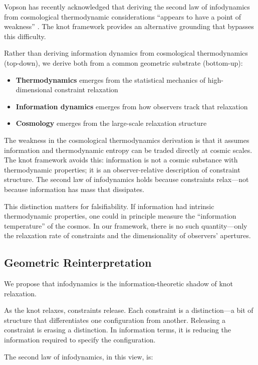\documentclass[11pt,a4paper]{article}
\begin{document}
Vopson has recently acknowledged that deriving the second law of infodynamics from cosmological thermodynamic considerations ``appears to have a point of weakness'' \cite{vopson2025cosmo}. The knot framework provides an alternative grounding that bypasses this difficulty.

Rather than deriving information dynamics from cosmological thermodynamics (top-down), we derive both from a common geometric substrate (bottom-up):
\begin{itemize}
    \item \textbf{Thermodynamics} emerges from the statistical mechanics of high-dimensional constraint relaxation
    \item \textbf{Information dynamics} emerges from how observers track that relaxation
    \item \textbf{Cosmology} emerges from the large-scale relaxation structure
\end{itemize}

The weakness in the cosmological thermodynamics derivation is that it assumes information and thermodynamic entropy can be traded directly at cosmic scales. The knot framework avoids this: information is not a cosmic substance with thermodynamic properties; it is an observer-relative description of constraint structure. The second law of infodynamics holds because constraints relax---not because information has mass that dissipates.

This distinction matters for falsifiability. If information had intrinsic thermodynamic properties, one could in principle measure the ``information temperature'' of the cosmos. In our framework, there is no such quantity---only the relaxation rate of constraints and the dimensionality of observers' apertures.

\subsection{Geometric Reinterpretation}

We propose that infodynamics is the information-theoretic shadow of knot relaxation.

As the knot relaxes, constraints release. Each constraint is a distinction---a bit of structure that differentiates one configuration from another. Releasing a constraint is erasing a distinction. In information terms, it is reducing the information required to specify the configuration.

The second law of infodynamics, in this view, is:
\end{document}
